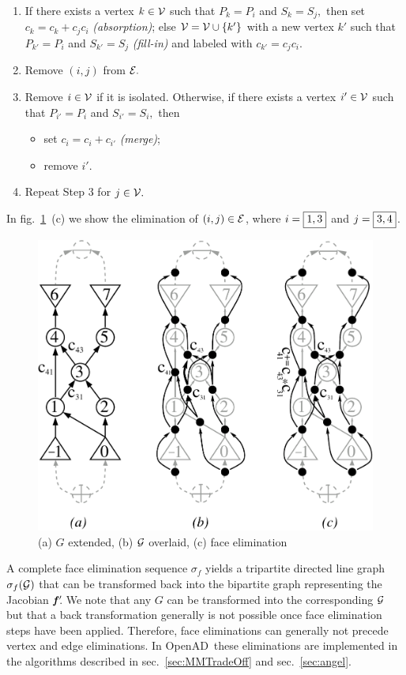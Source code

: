 \documentclass{book}
\newcommand{\OpenAD}{OpenAD}
\newcommand{\bmfp}{\mbox{\bf\em f$\,^\prime\!\!$}}
\newcommand{\refsec}[1]{{sec.~\ref{#1}}}
\newcommand{\reffig}[1]{{fig.~\ref{#1}}}
\begin{document}
\begin{enumerate}
\item If there exists a vertex $k \in \cal V$ such that $P_k = P_i$ and
  $S_k = S_j,$ then
  set $c_k = c_k + c_j c_i$ {\em (absorption)};
  else ${\cal V}={\cal V} \cup \{k'\}$ with a new vertex $k'$ such that
  $P_{k'} = P_i$ and $S_{k'} = S_j$
  {\em (fill-in)} and labeled with $c_{k'} = c_j c_i.$
\item Remove $(i,j)$ from $\cal E.$
\item Remove $i \in \cal V$ if it is isolated. Otherwise, if there exists a vertex $i' \in \cal V$ such that
  $P_{i'} = P_i$ and $S_{i'} = S_i,$ then
  \begin{itemize}
  \item set $c_i=c_i + c_{i'}$ {\em (merge)};
  \item remove $i'.$
  \end{itemize}
\item Repeat Step 3 for $j \in \cal V.$
\end{enumerate}
In \reffig{fig:face_elims}~(c) we show the elimination of $(i,j) \in \cal E$,
where $i=\framebox{$1,3$}$ and $j=\framebox{$3,4$}$.

\begin{figure}
  \centering\includegraphics[width=.65\textwidth]{face_elims}
  \caption{
    (a) $G$ extended, 
    (b) $\cal G$ overlaid, 
    (c) face elimination 
  }
  \label{fig:face_elims}
\end{figure}
A complete face elimination sequence $\sigma_f$ yields a tripartite 
directed line graph $\sigma_f({\cal G})$ that can be transformed back into 
the bipartite graph representing the Jacobian $\bmfp$.
We note that any $G$ can be transformed into the 
corresponding $\cal G$ but that a back transformation 
generally is not  possible once face elimination steps have been applied. 
Therefore, face eliminations can generally not precede vertex and edge 
eliminations.
In \OpenAD\ these eliminations are implemented in the algorithms described in 
\refsec{sec:MMTradeOff} and \refsec{sec:angel}.
\end{document}
